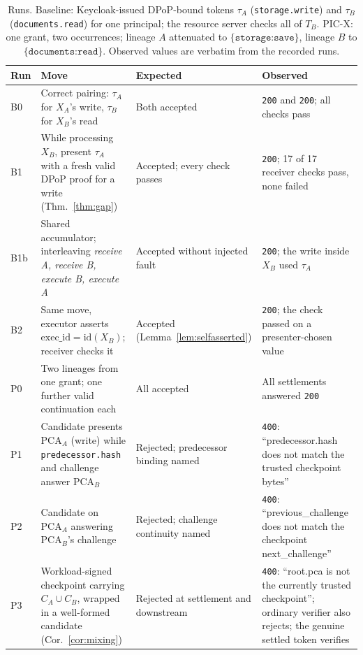 \documentclass[conference]{IEEEtran}
\begin{document}
\begin{table}[!tp]
\centering
\caption{Runs. Baseline: Keycloak-issued DPoP-bound tokens $\tau_A$ (\texttt{storage.write}) and $\tau_B$ (\texttt{documents.read}) for one principal; the resource server checks all of $T_B$. PIC-X: one grant, two occurrences; lineage $A$ attenuated to $\{\texttt{storage:save}\}$, lineage $B$ to $\{\texttt{documents:read}\}$. Observed values are verbatim from the recorded runs.}
\label{tab:runs}
\small
\begin{tabular}{@{}l>{\raggedright\arraybackslash}p{5.2cm}>{\raggedright\arraybackslash}p{3.6cm}>{\raggedright\arraybackslash}p{5.6cm}@{}}
\toprule
\textbf{Run} & \textbf{Move} & \textbf{Expected} & \textbf{Observed} \\
\midrule
B0 & Correct pairing: $\tau_A$ for $X_A$'s write, $\tau_B$ for $X_B$'s read & Both accepted & \texttt{200} and \texttt{200}; all checks pass \\
B1 & While processing $X_B$, present $\tau_A$ with a fresh valid DPoP proof for a write (Thm.~\ref{thm:gap}) & Accepted; every check passes & \texttt{200}; 17 of 17 receiver checks pass, none failed \\
B1b & Shared accumulator; interleaving \emph{receive A, receive B, execute B, execute A} & Accepted without injected fault & \texttt{200}; the write inside $X_B$ used $\tau_A$ \\
B2 & Same move, executor asserts $\mathrm{exec\_id}=\mathrm{id}(X_B)$; receiver checks it & Accepted (Lemma~\ref{lem:selfasserted}) & \texttt{200}; the check passed on a presenter-chosen value \\
\midrule
P0 & Two lineages from one grant; one further valid continuation each & All accepted & All settlements answered \texttt{200} \\
P1 & Candidate presents $\mathrm{PCA}_A$ (write) while \texttt{predecessor.hash} and challenge answer $\mathrm{PCA}_B$ & Rejected; predecessor binding named & \texttt{400}: ``predecessor.hash does not match the trusted checkpoint bytes'' \\
P2 & Candidate on $\mathrm{PCA}_A$ answering $\mathrm{PCA}_B$'s challenge & Rejected; challenge continuity named & \texttt{400}: ``previous\_challenge does not match the checkpoint next\_challenge'' \\
P3 & Workload-signed checkpoint carrying $C_A\cup C_B$, wrapped in a well-formed candidate (Cor.~\ref{cor:mixing}) & Rejected at settlement and downstream & \texttt{400}: ``root.pca is not the currently trusted checkpoint''; ordinary verifier also rejects; the genuine settled token verifies \\

\end{tabular}
\end{table}
\end{document}
